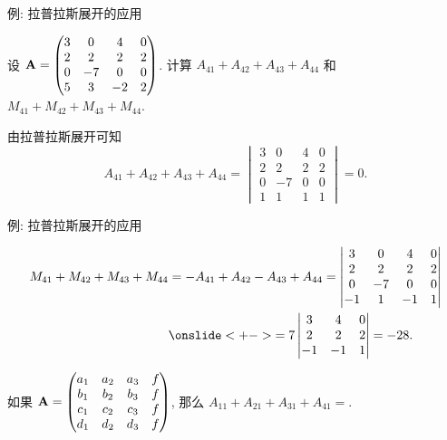 \begin{frame}{例: 拉普拉斯展开的应用}
	\onslide<+->
	\begin{example}
		设 ${\mathbf{A}}=\begin{pmatrix}
			3&0&4&0\\
			2&2&2&2\\
			0&-7&0&0\\
			5&3&-2&2
		\end{pmatrix}$.
		计算 $A_{41}+A_{42}+A_{43}+A_{44}$ 和 $M_{41}+M_{42}+M_{43}+M_{44}$.
	\end{example}
	\onslide<+->
	\begin{solution}
		由拉普拉斯展开可知
		\[A_{41}+A_{42}+A_{43}+A_{44}
		=\begin{vmatrix}
			3&0&4&0\\
			2&2&2&2\\
			0&-7&0&0\\
			1&1&1&1
		\end{vmatrix}=0.\]
	\end{solution}
\end{frame}


\begin{frame}{例: 拉普拉斯展开的应用}
	\onslide<+->
		\begin{solutionc}
			\vspace{-\baselineskip}
			\begin{align*}
				M_{41}+M_{42}+M_{43}+M_{44}
				&=-A_{41}+A_{42}-A_{43}+A_{44}
				=\begin{vmatrix}
					3&0&4&0\\
					2&2&2&2\\
					0&-7&0&0\\
					-1&1&-1&1
				\end{vmatrix}\\
				&\onslide<+->{=7\begin{vmatrix}
					3&4&0\\
					2&2&2\\
					-1&-1&1
				\end{vmatrix}=-28.}
		\end{align*}
	\end{solutionc}
	\onslide<+->
	\begin{exercise}
		如果 ${\mathbf{A}}=\begin{pmatrix}
			a_1&a_2&a_3&f\\
			b_1&b_2&b_3&f\\
			c_1&c_2&c_3&f\\
			d_1&d_2&d_3&f
		\end{pmatrix}$,
		那么 $A_{11}+A_{21}+A_{31}+A_{41}=$.
	\end{exercise}
\end{frame}


